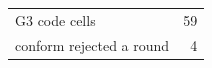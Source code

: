 \begin{tabular}{lr}
\toprule
G3 code cells & 59 \\
conform rejected a round & 4 \\
\bottomrule
\end{tabular}
